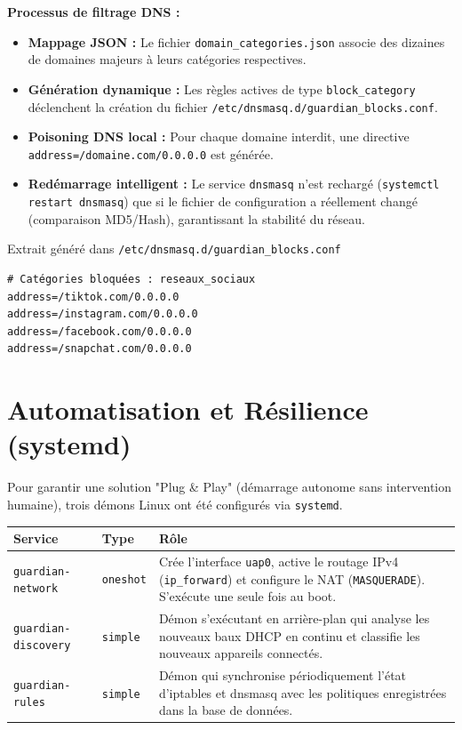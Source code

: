 \documentclass[11pt,a4paper]{article}
\begin{document}
\textbf{Processus de filtrage DNS :}
\begin{itemize}
    \item \textbf{Mappage JSON :} Le fichier \texttt{domain\_categories.json} associe des dizaines de domaines majeurs à leurs catégories respectives.
    \item \textbf{Génération dynamique :} Les règles actives de type \texttt{block\_category} déclenchent la création du fichier \texttt{/etc/dnsmasq.d/guardian\_blocks.conf}.
    \item \textbf{Poisoning DNS local :} Pour chaque domaine interdit, une directive \texttt{address=/domaine.com/0.0.0.0} est générée.
    \item \textbf{Redémarrage intelligent :} Le service \texttt{dnsmasq} n'est rechargé (\texttt{systemctl restart dnsmasq}) que si le fichier de configuration a réellement changé (comparaison MD5/Hash), garantissant la stabilité du réseau.
\end{itemize}

\begin{stepcadre}{Extrait généré dans \texttt{/etc/dnsmasq.d/guardian\_blocks.conf}}
\begin{lstlisting}[language=BashShell]
# Catégories bloquées : reseaux_sociaux
address=/tiktok.com/0.0.0.0
address=/instagram.com/0.0.0.0
address=/facebook.com/0.0.0.0
address=/snapchat.com/0.0.0.0
\end{lstlisting}
\end{stepcadre}

\section{Automatisation et Résilience (systemd)}

Pour garantir une solution "Plug \& Play" (démarrage autonome sans intervention humaine), trois démons Linux ont été configurés via \texttt{systemd}.

\begin{center}
\small
\begin{tabularx}{\textwidth}{|l|l|X|}
\hline
\rowcolor{lightblue}\textbf{Service} & \textbf{Type} & \textbf{Rôle} \\ \hline
\texttt{guardian-network} & \texttt{oneshot} & Crée l'interface \texttt{uap0}, active le routage IPv4 (\texttt{ip\_forward}) et configure le NAT (\texttt{MASQUERADE}). S'exécute une seule fois au boot. \\ \hline
\texttt{guardian-discovery} & \texttt{simple} & Démon s'exécutant en arrière-plan qui analyse les nouveaux baux DHCP en continu et classifie les nouveaux appareils connectés. \\ \hline
\texttt{guardian-rules} & \texttt{simple} & Démon qui synchronise périodiquement l'état d'iptables et dnsmasq avec les politiques enregistrées dans la base de données. \\ \hline
\end{tabularx}
\end{center}
\end{document}
